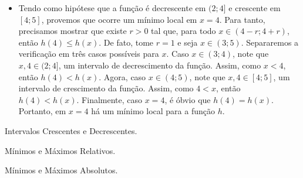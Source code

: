 \begin{solution}
\begin{itemize}
        \item Tendo como hipótese que a função é decrescente em $(2; 4]$ e crescente em $[4; 5]$, provemos que ocorre um mínimo local em $x=4$. Para tanto, precisamos mostrar que existe $r>0$ tal que, para todo $x \in (4-r; 4+r)$, então $h(4) \leq h(x)$. De fato, tome $r=1$ e seja $x \in (3; 5)$. Separaremos a verificação em três casos possíveis para $x$. Caso $x \in (3; 4)$, note que $x, 4 \in (2; 4]$, um intervalo de decrescimento da função. Assim, como $x<4$, então $h(4)< h(x)$. Agora, caso $x \in (4; 5)$, note que $x, 4 \in [4; 5]$, um intervalo de crescimento da função. Assim, como $4<x$, então $h(4)< h(x)$. Finalmente, caso $x=4$, é óbvio que $h(4)=h(x)$. Portanto, em $x=4$ há um mínimo local para a função $h$.
    \end{itemize}
\end{solution}

\begin{onlineact}
    {Intervalos Crescentes e Decrescentes}.
\end{onlineact}

\begin{onlineact}
    {Mínimos e Máximos Relativos}.
\end{onlineact}

\begin{onlineact}
    {Mínimos e Máximos Absolutos}.
\end{onlineact}